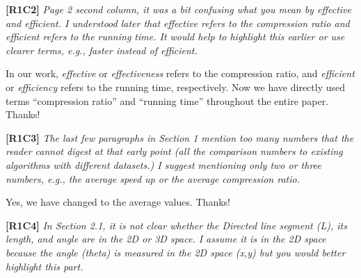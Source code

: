 \documentclass{letter}
\newcommand{\ie}{\emph{i.e.,}\xspace}
\begin{document}





\textbf{[R1C2]} \emph{Page 2 second column, it was a bit confusing what you mean by effective and efficient. I understood later that effective refers to the compression ratio and efficient refers to the running time. It would help to highlight this earlier or use clearer terms, e.g., faster instead of efficient.}

In our work, \emph{effective} or \emph{effectiveness} refers to the compression ratio, and \emph{efficient} or \emph{efficiency} refers to the running time, respectively. Now we have directly used terms ``compression ratio'' and ``running time'' throughout the entire paper. Thanks!


\textbf{[R1C3]} \emph{The last few paragraphs in Section 1 mention too many numbers that the reader cannot digest at that early point (all the comparison numbers to existing algorithms with different datasets.) I suggest mentioning only two or three numbers, e.g., the average speed up or the average compression ratio.}

Yes, we have changed to the average values. Thanks!

\textbf{[R1C4]} \emph{In Section 2.1, it is not clear whether the Directed line segment (L), its length, and angle are in the 2D or 3D space. I assume it is in the 2D space because the angle (theta) is measured in the 2D space (x,y) but you would better highlight this part.}
\end{document}
